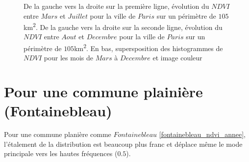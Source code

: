 \documentclass{book}
\begin{document}
\begin{figure}[H]
\begin{center}
\end{center}
\caption{De la gauche vers la droite sur la première ligne, évolution du $NDVI$ entre $Mars$ et $Juillet$ pour la ville de $Paris$ sur un périmètre de $105$km\textsuperscript{2}.
De la gauche vers la droite sur la seconde ligne, évolution du $NDVI$ entre $Aout$ et $Decembre$ pour la ville de $Paris$ sur un périmètre de $105$km\textsuperscript{2}. 
En bas, supersposition des histogrammes de $NDVI$ pour les mois de $Mars$ à $Decembre$ et image couleur}
\label{paris_ndvi_annee}
\end{figure}

\clearpage

\section{Pour une commune plainière (Fontainebleau)}

Pour une commune planière comme $Fontainebleau$ \ref{fontainebleau_ndvi_annee}, l'étalement de la distribution est beaucoup plus franc et déplace même
le mode principale vers les hautes fréquences ($0.5$).
 
\end{document}
